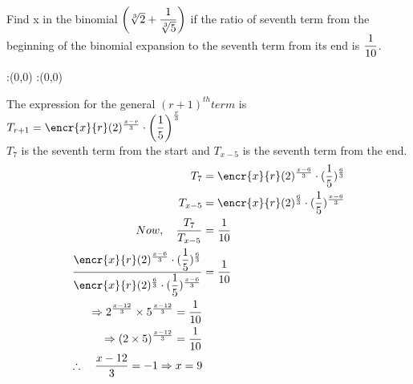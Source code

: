 



\question Find x in the binomial $\left( \sqrt[3]{2} + \dfrac{1}{\sqrt[3]{5}} \right)$ if the ratio of seventh term from the beginning of the binomial expansion to the seventh term from its end is $\dfrac{1}{10}$.


\watchout

\ifprintanswers
  \begin{marginfigure}
      :(0,0)
      :(0,0)
    \figdrawbegin{}
      \figdrawline [100,101]
    \figdrawend
    \figvisu{\figBoxA}{}{%
    }
    \centerline{\box\figBoxA}
  \end{marginfigure}
\fi 

\begin{solution}
The expression for the general $(r+1)^{th} term$ is \\ 
$T_{r+1} =\encr{x}{r} (\vbone)^{\frac{x-r}{3}} \cdot \left(\dfrac{1}{\vbtwo}\right)^{\frac{r}{3}}$\\
$T_{7}$ is the seventh term from the start and $T_{x-5}$ is the seventh term from the end. 
\begin{align}
T_{7} &= \encr{x}{r} (\vbone)^{\frac{x-6}{3}} \cdot (\dfrac{1}{\vbtwo})^{\frac{6}{3}} \\ 
T_{x-5} &= \encr{x}{r} (\vbone)^{\frac{6}{3}} \cdot (\dfrac{1}{\vbtwo})^{\frac{x-6}{3}} \\
Now, \quad \dfrac{T_{7}}{T_{x-5}} &= \dfrac{1}{\vbthree}\\
\dfrac{\encr{x}{r} (\vbone)^{\frac{x-6}{3}} \cdot (\dfrac{1}{\vbtwo})^{\frac{6}{3}}}{\encr{x}{r} (\vbone)^{\frac{6}{3}} \cdot (\dfrac{1}{\vbtwo})^{\frac{x-6}{3}}} &= \dfrac{1}{\vbthree} \\
\Rightarrow \vbone^{\frac{x-12}{3}} \times \vbtwo^{\frac{x-12}{3}} = \dfrac{1}{\vbthree} \\
\Rightarrow (\vbone \times \vbtwo) ^{\frac{x-12}{3}} =  \dfrac{1}{\vbthree} \\
\therefore \quad \dfrac{x-12}{3} = -1 \Rightarrow x = 9 
\end{align}
\end{solution}



